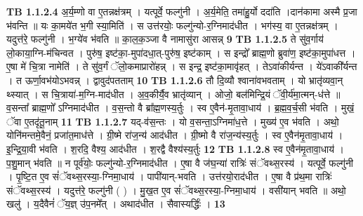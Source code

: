 \documentclass[17pt]{extarticle}
\begin{document}
                  \newline
                                \textbf{ TB 1.1.2.4} \newline
                  अ॒र्य॒म्णो वा ए॒तन्नक्ष॑त्रम् । यत्पूर्वे॒ फल्गु॑नी । अ॒र्य॒मेति॒ तमा॑हु॒र्यो ददा॑ति ।दान॑कामा अस्मै प्र॒जा भ॑वन्ति ॥ यः का॒मये॑त भ॒गी स्या॒मिति॑ । स उत्त॑रयोः॒ फल्गु॑न्यो-र॒ग्निमाद॑धीत । भग॑स्य॒ वा ए॒तन्नक्ष॑त्रम् । यदुत्त॑रे॒ फल्गु॑नी । भ॒ग्ये॑व भ॑वति ॥ का॒ल॒क॒ञ्जा वै नामासु॑रा आसन्न् \textbf{ 9} \newline
                  \newline
                                \textbf{ TB 1.1.2.5} \newline
                  ते सु॑व॒र्गाय॑ लो॒काया॒ग्नि-म॑चिन्वत । पुरु॑ष॒ इष्ट॑का॒-मुपा॑दधा॒त्-पुरु॑ष॒ इष्ट॑काम् । स इन्द्रो᳚ ब्राह्म॒णो ब्रुवा॑ण॒ इष्ट॑का॒मुपा॑धत्त । ए॒षा मे॑ चि॒त्रा नामेति॑ । ते सु॑व॒र्गं ॅलो॒कमाप्रारो॑हन्न् । स इन्द्र॒ इष्ट॑का॒मावृ॑हत् । तेऽवा॑कीर्यन्त । ये॑ऽवाकी᳚र्यन्त । त ऊर्णा॒वभ॑योऽभवन्न् । द्वावुद॑पतताम् \textbf{ 10} \newline
                  \newline
                                \textbf{ TB 1.1.2.6} \newline
                  तौ दि॒व्यौ श्वाना॑वभवताम् । यो भ्रातृ॑व्यवा॒न् थ्स्यात् । स चि॒त्राया॑-म॒ग्नि-माद॑धीत । अ॒व॒कीर्यै॒व भ्रातृ॑व्यान् । ओजो॒ बल॑मिन्द्रि॒यं ॅवी॒र्य॑मा॒त्मन्-ध॑त्ते ॥ व॒सन्ता᳚ ब्राह्म॒णो᳚ ऽग्निमाद॑धीत । व॒स॒न्तो वै ब्रा᳚ह्म॒णस्य॒र्तुः । स्व ए॒वैन॑-मृ॒तावा॒धाय॑ । ब्र॒ह्म॒व॒र्च॒सी भ॑वति । मुखं॒ ॅवा ए॒तदृ॑तू॒नाम् \textbf{ 11} \newline
                  \newline
                                \textbf{ TB 1.1.2.7} \newline
                  यद्-व॑स॒न्तः । यो व॒सन्ता॒ऽग्निमा॑ध॒त्ते । मुख्य॑ ए॒व भ॑वति । अथो॒ योनि॑मन्तमे॒वैनं॒ प्रजा॑त॒माध॑त्ते । ग्री॒ष्मे रा॑ज॒न्य॑ आद॑धीत । ग्री॒ष्मो वै रा॑ज॒न्य॑स्य॒र्तुः । स्व ए॒वैन॑मृ॒तावा॒धाय॑ । इ॒न्द्रि॒या॒वी भ॑वति । श॒रदि॒ वैश्य॒ आद॑धीत । श॒रद्वै वैश्य॑स्य॒र्तुः \textbf{ 12} \newline
                  \newline
                                \textbf{ TB 1.1.2.8} \newline
                  स्व ए॒वैन॑मृ॒तावा॒धाय॑ । प॒शु॒मान् भ॑वति ॥ न पूर्व॑योः॒ फल्गु॑न्यो-र॒ग्निमाद॑धीत । ए॒षा वै ज॑घ॒न्या॑ रात्रिः॑ संॅवथ्स॒रस्य॑ । यत्पूर्वे॒ फल्गु॑नी । पृ॒ष्टि॒त ए॒व सं॑ॅवथ्स॒रस्या॒-ग्निमा॒धाय॑ । पापी॑यान्-भवति । उत्त॑रयो॒राद॑धीत । ए॒षा वै प्र॑थ॒मा रात्रिः॑ संॅवथ्स॒रस्य॑ । यदुत्त॑रे॒ फल्गु॑नी ( ) । मु॒ख॒त ए॒व सं॑ॅवथ्स॒रस्या॒-ग्निमा॒धाय॑ । वसी॑यान् भवति ॥ अथो॒ खलु॑ । य॒दैवैनं॑ ॅय॒ज्ञ् उ॑प॒नमे᳚त् । अथाद॑धीत । सैवास्यर्द्धिः॑ । \textbf{ 13} \newline
\end{document}
